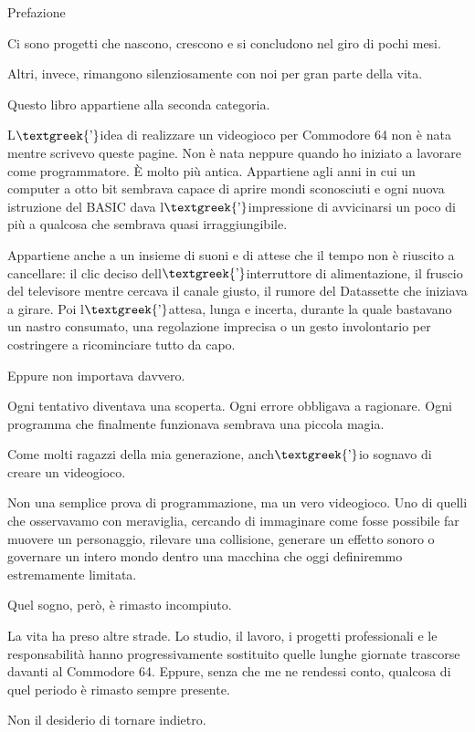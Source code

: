 \documentclass{article}
\author{HP}
\date{2026-07-28}
\begin{document}
Prefazione

Ci sono progetti che nascono, crescono e si concludono nel giro di pochi mesi.

Altri, invece, rimangono silenziosamente con noi per gran parte della vita.

Questo libro appartiene alla seconda categoria.

L$\text{\textgreek{’}}$idea di realizzare un videogioco per Commodore 64 non è nata mentre scrivevo queste pagine. Non è
nata neppure quando ho iniziato a lavorare come programmatore. È molto più antica. Appartiene agli anni in cui un
computer a otto bit sembrava capace di aprire mondi sconosciuti e ogni nuova istruzione del BASIC dava
l$\text{\textgreek{’}}$impressione di avvicinarsi un poco di più a qualcosa che sembrava quasi irraggiungibile.

Appartiene anche a un insieme di suoni e di attese che il tempo non è riuscito a cancellare: il clic deciso
dell$\text{\textgreek{’}}$interruttore di alimentazione, il fruscio del televisore mentre cercava il canale giusto, il
rumore del Datassette che iniziava a girare. Poi l$\text{\textgreek{’}}$attesa, lunga e incerta, durante la quale
bastavano un nastro consumato, una regolazione imprecisa o un gesto involontario per costringere a ricominciare tutto
da capo.

Eppure non importava davvero.

Ogni tentativo diventava una scoperta. Ogni errore obbligava a ragionare. Ogni programma che finalmente funzionava
sembrava una piccola magia.

Come molti ragazzi della mia generazione, anch$\text{\textgreek{’}}$io sognavo di creare un videogioco.

Non una semplice prova di programmazione, ma un vero videogioco. Uno di quelli che osservavamo con meraviglia, cercando
di immaginare come fosse possibile far muovere un personaggio, rilevare una collisione, generare un effetto sonoro o
governare un intero mondo dentro una macchina che oggi definiremmo estremamente limitata.

Quel sogno, però, è rimasto incompiuto.

La vita ha preso altre strade. Lo studio, il lavoro, i progetti professionali e le responsabilità hanno progressivamente
sostituito quelle lunghe giornate trascorse davanti al Commodore 64. Eppure, senza che me ne rendessi conto, qualcosa
di quel periodo è rimasto sempre presente.

Non il desiderio di tornare indietro.
\end{document}
